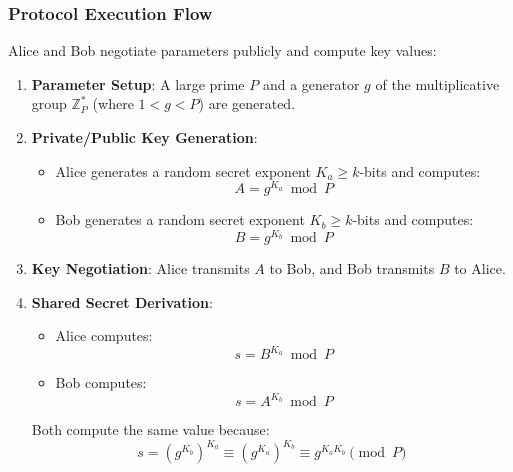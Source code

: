 \documentclass[11pt,a4paper]{article}
\begin{document}
\subsubsection{Protocol Execution Flow}
Alice and Bob negotiate parameters publicly and compute key values:
\begin{enumerate}
    \item \textbf{Parameter Setup}: A large prime $P$ and a generator $g$ of the multiplicative group $\mathbb{Z}_P^*$ (where $1 < g < P$) are generated.
    \item \textbf{Private/Public Key Generation}:
    \begin{itemize}
        \item Alice generates a random secret exponent $K_a \ge k$-bits and computes:
        \begin{equation}
            A = g^{K_a} \bmod P
        \end{equation}
        \item Bob generates a random secret exponent $K_b \ge k$-bits and computes:
        \begin{equation}
            B = g^{K_b} \bmod P
        \end{equation}
    \end{itemize}
    \item \textbf{Key Negotiation}: Alice transmits $A$ to Bob, and Bob transmits $B$ to Alice.
    \item \textbf{Shared Secret Derivation}:
    \begin{itemize}
        \item Alice computes:
        \begin{equation}
            s = B^{K_a} \bmod P
        \end{equation}
        \item Bob computes:
        \begin{equation}
            s = A^{K_b} \bmod P
        \end{equation}
    \end{itemize}
    Both compute the same value because:
    \begin{equation}
        s = (g^{K_b})^{K_a} \equiv (g^{K_a})^{K_b} \equiv g^{K_a K_b} \pmod{P}
    \end{equation}
\end{enumerate}
\end{document}
